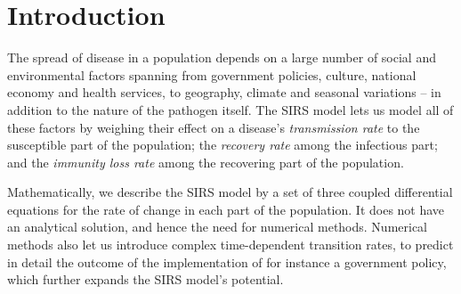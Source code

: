 \documentclass[]{article}
\begin{document}
\section{Introduction} \label{sec:intro}

The spread of disease in a population depends on a large number of social and environmental factors spanning from government policies, culture, national economy and health services, to geography, climate and seasonal variations -- in addition to the nature of the pathogen itself. The SIRS model lets us model all of these factors by weighing their effect on a disease's \textit{transmission rate} to the susceptible part of the population; the \textit{recovery rate} among the infectious part; and the \textit{immunity loss rate} among the recovering part of the population.

Mathematically, we describe the SIRS model by a set of three coupled differential equations for the rate of change in each part of the population. It does not have an analytical solution, and hence the need for numerical methods. Numerical methods also let us introduce complex time-dependent transition rates, to predict in detail the outcome of the implementation of for instance a government policy, which further expands the SIRS model's potential. 
\end{document}
